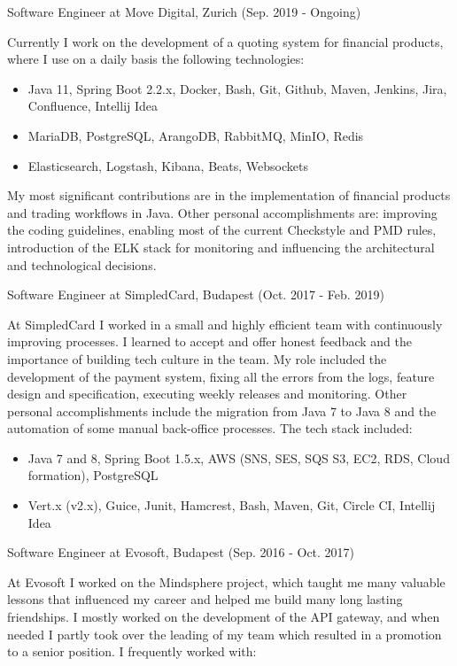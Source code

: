 \documentclass[hidelinks,11pt]{friggeri-cv}
\newenvironment{experience}{\begin{adjustwidth}{-4.6cm}{}}{\end{adjustwidth}}
\begin{document}
\begin{experience}

{\LARGE Software Engineer at Move Digital, Zurich (Sep. 2019 - Ongoing)}

Currently I work on the development of a quoting system for financial products, where I use on a daily basis the following technologies:

\begin{itemize}
	\item Java 11, Spring Boot 2.2.x, Docker, Bash, Git, Github, Maven, Jenkins, Jira, Confluence, Intellij Idea
	\item MariaDB, PostgreSQL, ArangoDB, RabbitMQ, MinIO, Redis
  \item Elasticsearch, Logstash, Kibana, Beats, Websockets
\end{itemize}

My most significant contributions are in the implementation of financial products and trading workflows in Java.
Other personal accomplishments are: improving the coding guidelines, enabling most of the current Checkstyle and PMD rules, introduction of the ELK stack for monitoring and influencing the architectural and technological decisions.

{\LARGE Software Engineer at SimpledCard, Budapest (Oct. 2017 - Feb. 2019)}

At SimpledCard I worked in a small and highly efficient team with continuously improving processes.
I learned to accept and offer honest feedback and the importance of building tech culture in the team.
My role included the development of the payment system, fixing all the errors from the logs, feature design and specification, executing weekly releases and monitoring.
Other personal accomplishments include the migration from Java 7 to Java 8 and the automation of some manual back-office processes. The tech stack included:

\begin{itemize}
	\item Java 7 and 8, Spring Boot 1.5.x, AWS (SNS, SES, SQS S3, EC2, RDS, Cloud formation), PostgreSQL
	\item Vert.x (v2.x), Guice, Junit, Hamcrest, Bash, Maven, Git, Circle CI, Intellij Idea
\end{itemize}

{\LARGE Software Engineer at Evosoft, Budapest (Sep. 2016 - Oct. 2017)}

At Evosoft I worked on the Mindsphere project, which taught me many valuable lessons that influenced my career and helped me build many long lasting friendships.
I mostly worked on the development of the API gateway, and when needed I partly took over the leading of my team which resulted in a promotion to a senior position.
I frequently worked with:


\end{experience}
\end{document}
